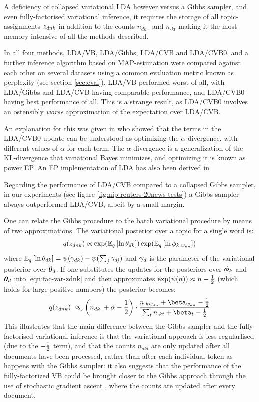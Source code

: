 A deficiency of collapsed variational LDA however versus a Gibbs sampler, and even fully-factorised variational inference, it requires the storage of all topic-assignments $\zdnk$ in addition to the counts $n_{dk\cdot}$ and $n_{\cdot kt}$ making it the most memory intensive of all the methods described.

In \cite{Asuncion2012} all four methods, LDA/VB, LDA/Gibbs, LDA/CVB and LDA/CVB0, and a further inference algorithm based on MAP-estimation were compared against each other on several datasets using a common evaluation metric known as perplexity (see section \ref{sec:eval}). LDA/VB performed worst of all, with LDA/Gibbs and LDA/CVB having comparable performance, and LDA/CVB0 having best performance of all. This is a strange result, as LDA/CVB0 involves an ostensibly \emph{worse} approximation of the expectation over LDA/CVB. 

An explanation for this was given in\cite{Sato2012} who showed that the terms in the LDA/CVB0 update can be understood as optimizing the $\alpha$-divergence\cite{Minka2005}, with different values of $\alpha$ for each term. The $\alpha$-divergence is a generalization of the KL-divergence that variational Bayes minimizes, and optimizing it is known as power EP. An EP implementation of LDA has also been derived in \cite{Minka2002}

Regarding the performance of LDA/CVB compared to a collapsed Gibbs sampler, in our experiments (see figure \ref{fig:nip-reuters-20news-tests}) a Gibbs sampler always outperformed LDA/CVB, albeit by a small margin.

One can relate the Gibbs procedure to the batch variational procedure by means of two approximations. The variational posterior over a topic for a single word is:
\begin{align}
q(z_{dnk}) \propto \exp(\ex{\ln \theta_{dk}}{q})\exp(\ex{\ln \phi_{k,w_{dn}}}{q})
\label{eqn:fac-var-zdnk}
\end{align}
where $\ex{\ln \theta_{dk}}{q} = \psi(\gamma_{dk}) - \psi(\sum_j \gamma_{dj})$ and $\vv{\gamma}_d$ is the parameter of the variational posterior over $\thd$. If one substitutes the updates for the posteriors over $\pk$ and $\thd$ into \eqref{eqn:fac-var-zdnk} and then approximates $\exp(\psi(n)) \approx n - \half$ (which holds for large positive numbers) the posterior becomes:
\begin{align}
q(z_{dnk}) \approxpropto \left(n_{dk\cdot} + \alpha - \half\right) \cdot \frac{n_{\cdot k w_{dn}} + \beta_{w_{dn}} - \half}{\sum_t n_{\cdot k t} + \beta_t - \half}
\end{align}
This illustrates that the main difference between the Gibbs sampler and the fully-factorised variational inference is that the variational approach is less regularlised (due to the $-\half$ term), and that the counts $n_{dkt}$ are only updated after all documents have been processed, rather than after each individual token as happens with the Gibbs sampler: it also suggests that the performance of the fully-factorized VB could be brought closer to the Gibbs approach through the use of stochastic gradient ascent\cite{Hoffman2012} , where the counts are updated after every document.


